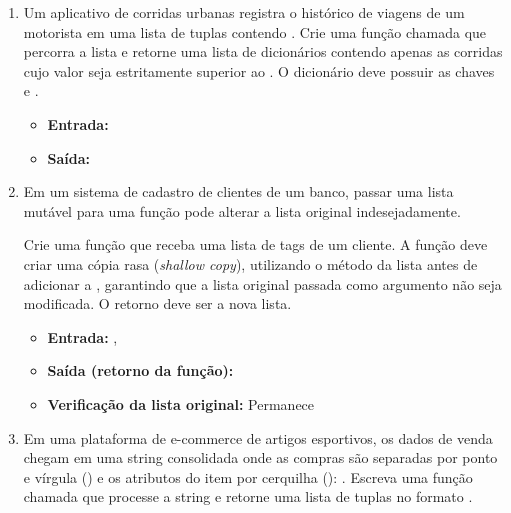 \begin{enumerate}[label=\textbf{Q\arabic*.}]




\item Um aplicativo de corridas urbanas registra o histórico de viagens de um motorista em uma lista de tuplas contendo . Crie uma função chamada  que percorra a lista e retorne uma lista de dicionários contendo apenas as corridas cujo valor seja estritamente superior ao . O dicionário deve possuir as chaves  e .

\begin{itemize}[leftmargin=*]
    \item \textbf{Entrada:} 
    \item \textbf{Saída:} \code{[\{'id': 101, 'destino': (-23.55, -46.63)\}]}
\end{itemize}




\item Em um sistema de cadastro de clientes de um banco, passar uma lista mutável para uma função pode alterar a lista original indesejadamente. 

Crie uma função  que receba uma lista de tags de um cliente. A função deve criar uma cópia rasa (\emph{shallow copy}), utilizando o método  da lista antes de adicionar a , garantindo que a lista original passada como argumento não seja modificada. O retorno deve ser a nova lista.

\begin{itemize}[leftmargin=*]
    \item \textbf{Entrada:} , 
    \item \textbf{Saída (retorno da função):} 
    \item \textbf{Verificação da lista original:} Permanece 
\end{itemize}



\item Em uma plataforma de e-commerce de artigos esportivos, os dados de venda chegam em uma string consolidada onde as compras são separadas por ponto e vírgula (\code{;}) e os atributos do item por cerquilha (\code{\#}): . Escreva uma função chamada  que processe a string e retorne uma lista de tuplas no formato .


\end{enumerate}
